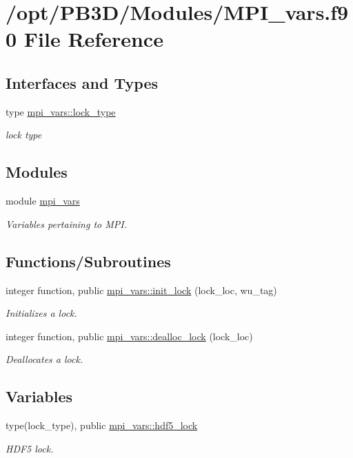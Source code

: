 \hypertarget{MPI__vars_8f90}{}\section{/opt/\+P\+B3\+D/\+Modules/\+M\+P\+I\+\_\+vars.f90 File Reference}
\label{MPI__vars_8f90}
\subsection*{Interfaces and Types}
\begin{DoxyCompactItemize}
\item 
type \hyperlink{structmpi__vars_1_1lock__type}{mpi\+\_\+vars\+::lock\+\_\+type}
\begin{DoxyCompactList}\small\item\em lock type \end{DoxyCompactList}\end{DoxyCompactItemize}
\subsection*{Modules}
\begin{DoxyCompactItemize}
\item 
module \hyperlink{namespacempi__vars}{mpi\+\_\+vars}
\begin{DoxyCompactList}\small\item\em Variables pertaining to M\+PI. \end{DoxyCompactList}\end{DoxyCompactItemize}
\subsection*{Functions/\+Subroutines}
\begin{DoxyCompactItemize}
\item 
integer function, public \hyperlink{namespacempi__vars_ab38aeec20e567cf6f272587890ead066}{mpi\+\_\+vars\+::init\+\_\+lock} (lock\+\_\+loc, wu\+\_\+tag)
\begin{DoxyCompactList}\small\item\em Initializes a lock. \end{DoxyCompactList}\item 
integer function, public \hyperlink{namespacempi__vars_af03c942b5f1c980adf9e1b2ba3f4bd58}{mpi\+\_\+vars\+::dealloc\+\_\+lock} (lock\+\_\+loc)
\begin{DoxyCompactList}\small\item\em Deallocates a lock. \end{DoxyCompactList}\end{DoxyCompactItemize}
\subsection*{Variables}
\begin{DoxyCompactItemize}
\item 
type(lock\+\_\+type), public \hyperlink{namespacempi__vars_a834e19cd963fef0ad150e22aa3c56d53}{mpi\+\_\+vars\+::hdf5\+\_\+lock}
\begin{DoxyCompactList}\small\item\em H\+D\+F5 lock. \end{DoxyCompactList}\end{DoxyCompactItemize}
